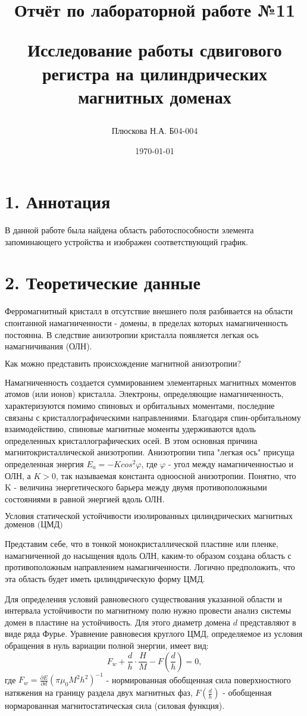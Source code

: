 \documentclass[a4paper,12pt]{report}
\title{Отчёт по лабораторной работе №11

Исследование работы сдвигового регистра на цилиндрических магнитных доменах}
\author{Плюскова Н.А. Б04-004 }
\date{\today}
\begin{document}
\maketitle

\section*{1. Аннотация}
В данной работе была найдена область работоспособности элемента запоминающего устройства и изображен соответствующий график.

\section*{2. Теоретические данные}
Ферромагнитный кристалл в отсутствие внешнего поля разбивается на области спонтанной намагниченности - домены, в пределах которых намагниченность постоянна. В следствие анизотропии кристалла появляется легкая ось намагничивания (ОЛН).

$\textbf{Как можно представить происхождение магнитной анизотропии?}$

Намагниченность создается суммированием элементарных магнитных моментов атомов (или ионов) кристалла. Электроны, определяющие намагниченность, характеризуются помимо спиновых и орбитальных моментами, последние связаны с кристаллографическими направлениями. Благодаря спин-орбитальному взаимодействию, спиновые магнитные моменты удерживаются вдоль определенных кристаллографических осей. В этом основная причина магнитокристаллической анизотропии. Анизотропии типа "легкая ось" присуща определенная энергия $E_a = -Kcos^2\varphi$, где $\varphi$ - угол между намагниченностью и ОЛН, а $K>0$, так называемая константа одноосной анизотропии. Понятно, что K - величина энергетического барьера между двумя противоположными состояниями в равной энергией вдоль ОЛН.

$\textbf{Условия статической устойчивости изолированных цилиндрических магнитных}$
$\textbf{доменов (ЦМД)}$

Представим себе, что в тонкой монокристаллической пластине или пленке, намагниченной до насыщения вдоль ОЛН, каким-то образом создана область с противоположным направлением намагниченности. Логично предположить, что эта область будет иметь цилиндрическую форму ЦМД.

Для определения условий равновесного существования указанной области и интервала устойчивости по магнитному полю нужно провести анализ системы домен в пластине на устойчивость. Для этого диаметр домена $d$ представляют в виде ряда Фурье.
Уравнение равновесия круглого ЦМД, определяемое из условия обращения в нуль вариации полной энергии, имеет вид:
\begin{equation}
    F_{w} + \frac{d}{h}\cdot\frac{H}{M} - F(\frac{d}{h}) = 0,
\end{equation}
где $F_{w} = \frac{\partial E}{\partial d}(\pi \mu_{0} M^2h^2)^{-1}$ - нормированная обобщенная сила поверхностного натяжения на границу раздела двух магнитных фаз, $F(\frac{d}{h})$ - обобщенная нормарованная магнитостатическая сила (силовая функция).
\end{document}
